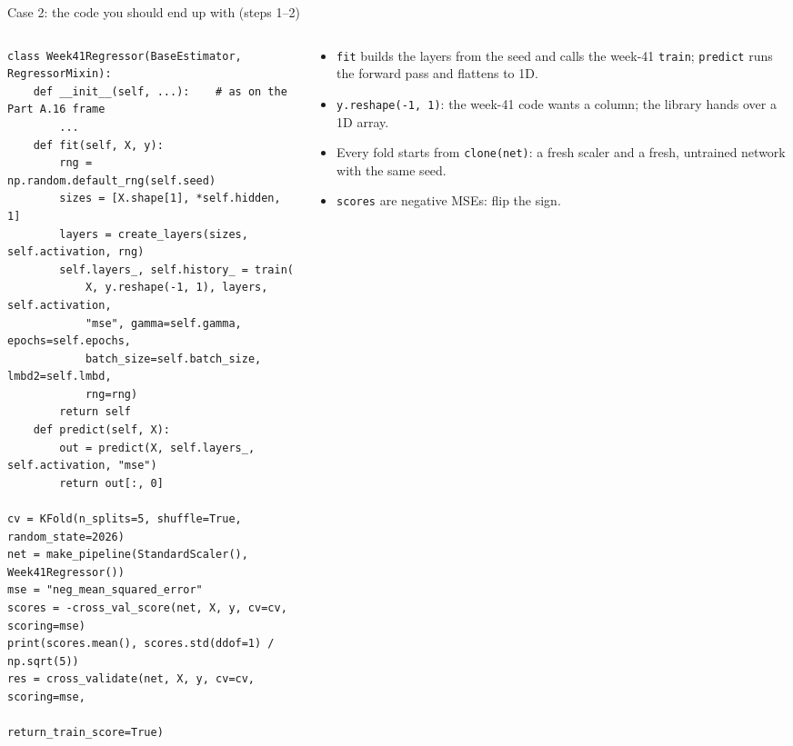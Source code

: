 \documentclass[10pt,aspectratio=169]{beamer}
\begin{document}
\begin{frame}[fragile]{Case 2: the code you should end up with (steps 1--2)}
\begin{columns}[T]
\begin{column}{0.66\textwidth}
\begin{lstlisting}
class Week41Regressor(BaseEstimator, RegressorMixin):
    def __init__(self, ...):    # as on the Part A.16 frame
        ...
    def fit(self, X, y):
        rng = np.random.default_rng(self.seed)
        sizes = [X.shape[1], *self.hidden, 1]
        layers = create_layers(sizes, self.activation, rng)
        self.layers_, self.history_ = train(
            X, y.reshape(-1, 1), layers, self.activation,
            "mse", gamma=self.gamma, epochs=self.epochs,
            batch_size=self.batch_size, lmbd2=self.lmbd,
            rng=rng)
        return self
    def predict(self, X):
        out = predict(X, self.layers_, self.activation, "mse")
        return out[:, 0]

cv = KFold(n_splits=5, shuffle=True, random_state=2026)
net = make_pipeline(StandardScaler(), Week41Regressor())
mse = "neg_mean_squared_error"
scores = -cross_val_score(net, X, y, cv=cv, scoring=mse)
print(scores.mean(), scores.std(ddof=1) / np.sqrt(5))
res = cross_validate(net, X, y, cv=cv, scoring=mse,
                     return_train_score=True)
\end{lstlisting}
\end{column}
\begin{column}{0.32\textwidth}
\small
\begin{itemize}
  \item \texttt{fit} builds the layers from the seed and calls the
        week-41 \texttt{train}; \texttt{predict} runs the forward pass and
        flattens to 1D.
  \item \texttt{y.reshape(-1, 1)}: the week-41 code wants a column; the
        library hands over a 1D array.
  \item Every fold starts from \texttt{clone(net)}: a fresh scaler and a
        fresh, untrained network with the same seed.
  \item \texttt{scores} are negative MSEs: flip the sign.
\end{itemize}
\end{column}
\end{columns}
\end{frame}
\end{document}
